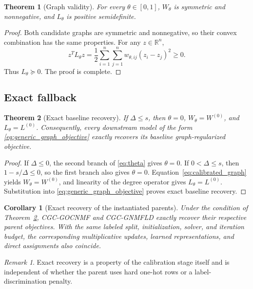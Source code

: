 \documentclass[11pt]{article}
\newtheorem{theorem}{Theorem}
\newtheorem{corollary}{Corollary}
\theoremstyle{remark}
\newtheorem{remark}{Remark}
\newcommand{\R}{\mathbb{R}}
\begin{document}
\begin{theorem}[Graph validity]
For every $\theta\in[0,1]$, $W_{\theta}$ is symmetric and nonnegative, and $L_{\theta}$ is positive semidefinite.
\end{theorem}

\begin{proof}
Both candidate graphs are symmetric and nonnegative, so their convex combination has the same properties. For any $z\in\R^n$,
\[
z^{T}L_{\theta}z=\frac12\sum_{i=1}^{n}\sum_{j=1}^{n}w_{\theta,ij}(z_i-z_j)^2\ge0.
\]
Thus $L_{\theta}\succeq0$. The proof is complete.
\end{proof}

\subsection{Exact fallback}

\begin{theorem}[Exact baseline recovery]
\label{thm:exact_recovery}
If $\Delta\le s$, then $\theta=0$, $W_{\theta}=W^{(0)}$, and $L_{\theta}=L^{(0)}$. Consequently, every downstream model of the form \eqref{eq:generic_graph_objective} exactly recovers its baseline graph-regularized objective.
\end{theorem}

\begin{proof}
If $\Delta\le0$, the second branch of \eqref{eq:theta} gives $\theta=0$. If $0<\Delta\le s$, then $1-s/\Delta\le0$, so the first branch also gives $\theta=0$. Equation~\eqref{eq:calibrated_graph} yields $W_\theta=W^{(0)}$, and linearity of the degree operator gives $L_\theta=L^{(0)}$. Substitution into \eqref{eq:generic_graph_objective} proves exact baseline recovery.
\end{proof}

\begin{corollary}[Exact recovery of the instantiated parents]
Under the condition of Theorem~\ref{thm:exact_recovery}, CGC-GOCNMF and CGC-GNMFLD exactly recover their respective parent objectives. With the same labeled split, initialization, solver, and iteration budget, the corresponding multiplicative updates, learned representations, and direct assignments also coincide.
\end{corollary}

\begin{remark}
Exact recovery is a property of the calibration stage itself and is independent of whether the parent uses hard one-hot rows or a label-discrimination penalty.
\end{remark}
\end{document}
